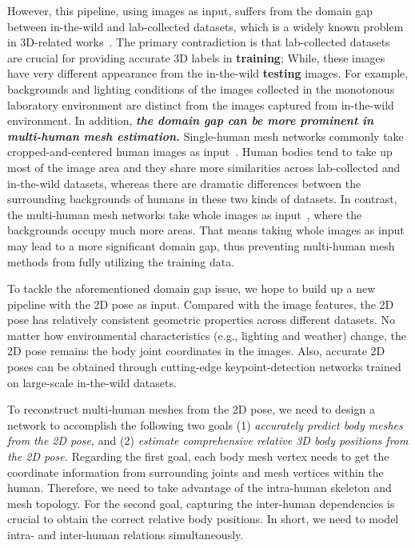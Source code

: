 \documentclass[runningheads]{llncs}
\begin{document}
However, this pipeline, using images as input, suffers from the domain gap between in-the-wild and lab-collected datasets, which is a widely known problem in 3D-related works~\cite{Zhou_2017_ICCV,wang2019generalizing,choi2020pose2mesh,gong2021poseaug,martinez2017simple,Wu_2020_CVPR}. The primary contradiction is that lab-collected datasets~\cite{ionescu2013human3,sigal2010humaneva} are crucial for providing accurate 3D labels in \textbf{training}; While, these images have very different appearance from the in-the-wild \textbf{testing} images. 
For example, backgrounds and lighting conditions of the images collected in the monotonous laboratory environment are distinct from the images captured from in-the-wild environment. 
In addition, \textbf{\textit{the domain gap can be more prominent in multi-human mesh estimation.}} Single-human mesh networks commonly take cropped-and-centered human images as input~\cite{kolotouros2019learning,kolotouros2019convolutional,moon2020i2l}. 
Human bodies tend to take up most of the image area and they share more similarities across lab-collected and in-the-wild datasets, whereas there are dramatic differences between the surrounding backgrounds of humans in these two kinds of datasets. 
In contrast, the multi-human mesh networks take whole images as input~\cite{zhang2021body,jiang2020coherent,sun2021monocular}, where the backgrounds occupy much more areas. 
That means taking whole images as input may lead to a more significant domain gap, thus preventing multi-human mesh methods from fully utilizing the training data.

To tackle the aforementioned domain gap issue, we hope to build up a new pipeline with the 2D pose as input. 
Compared with the image features, the 2D pose has relatively consistent geometric properties across different datasets. 
No matter how environmental characteristics (e.g., lighting and weather) change, the 2D pose remains the body joint coordinates in the images. 
Also, accurate 2D poses can be obtained through cutting-edge keypoint-detection networks\cite{sun2019deep,cao2017realtime,he2017mask} trained on large-scale in-the-wild datasets.

To reconstruct multi-human meshes from the 2D pose, we need to design a network to accomplish the following two goals (1) \textit{accurately predict body meshes from the 2D pose,} and (2) \textit{estimate comprehensive relative 3D body positions from the 2D pose.} 
Regarding the first goal, each body mesh vertex needs to get the coordinate information from surrounding joints and mesh vertices within the human.
Therefore, we need to take advantage of the intra-human skeleton and mesh topology.
For the second goal, capturing the inter-human dependencies is crucial to obtain the correct relative body positions.
In short, we need to model intra- and inter-human relations simultaneously.
\end{document}
